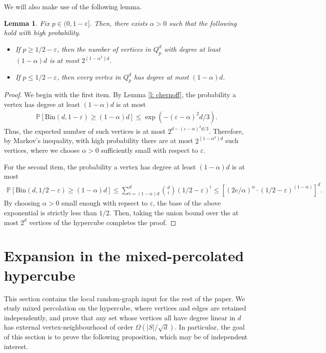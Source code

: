 \documentclass{article}
\newtheorem{lemma}[thm]{Lemma}
\theoremstyle{definition}
\newcommand{\eps}{\varepsilon}
\begin{document}
We will also make use of the following lemma.
\begin{lemma}\label{lem: degrees}
Fix $p\in (0,1-\varepsilon]$. Then, there exists $\alpha>0$ such that the following hold with high probability.
    \begin{itemize}
        \item If $p\geq 1/2-\varepsilon$, then the number of vertices in $Q_p^d$ with degree at least $(1-\alpha)d$ is at most $2^{(1-\alpha^3) d}$.
        \item If $p\leq 1/2-\varepsilon$, then every vertex in $Q_p^d$ has degree at most $(1-\alpha)d$.
    \end{itemize}
\end{lemma}
\begin{proof}
We begin with the first item. By Lemma \ref{l: chernoff}, the probability a vertex has degree at least $(1-\alpha)d$ is at most
\begin{align*}
    \mathbb P\left[\mathrm{Bin}(d,1-\eps)\ge (1-\alpha) d\right]\le \exp\left(-(\eps-\alpha)^2d/3\right).
\end{align*}
Thus, the expected number of such vertices is at most $2^{d-(\eps-\alpha)^2d/3}$. Therefore, by Markov's inequality, with high probability there are at most $2^{(1-\alpha^3)d}$ such vertices, where we choose $\alpha>0$ sufficiently small with respect to $\eps$.

For the second item, 
the probability a vertex has degree at least $(1-\alpha)d$ is at most
\begin{align*}
    \mathbb P\left[\mathrm{Bin}(d,1/2-\eps)\ge (1-\alpha) d\right]\le \sum_{i=(1-\alpha)d}^d\binom{d}{i}(1/2-\eps)^i\le \left[\left(2e/\alpha\right)^{\alpha}\cdot (1/2-\eps)^{(1-\alpha)}\right]^d.
\end{align*}
By choosing $\alpha>0$ small enough with repsect to $\eps$, the base of the above exponential is strictly less than $1/2$. Then, taking the union bound over the at most $2^d$ vertices of the hypercube completes the proof.
\end{proof}

\section{Expansion in the mixed-percolated hypercube}\label{sec: mixed perco}
This section contains the local random-graph input for the rest of the paper. 
We study mixed percolation on the hypercube, where vertices and
edges are retained independently, and prove that any set whose
vertices all have degree linear in $d$ has external
vertex-neighbourhood of order $\Omega(|S|/\sqrt d)$.
In particular, the goal of this section is to prove the following proposition, which may be of independent interest.
\end{document}
